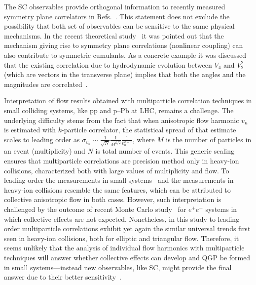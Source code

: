The SC observables provide orthogonal information to recently measured symmetry plane correlators in Refs.~\cite{ALICE:2011ab,Adare:2011tg,Aad:2014fla}. This statement does not exclude the possibility that both set of observables can be sensitive to the same physical mechanisms. In the recent theoretical study~\cite{Giacalone:2016afq} it was pointed out that the mechanism giving rise to symmetry plane correlations (nonlinear coupling) can also contribute to symmetric cumulants. As a concrete example it was discussed that the existing correlation due to hydrodynamic evolution between $V_4$ and $V_2^2$ (which are vectors in the transverse plane) implies that both the angles and the magnitudes are correlated~\cite{Giacalone:2016afq}. 

Interpretation of flow results obtained with multiparticle correlation techniques in small colliding systems, like pp and p--Pb at LHC, remains a challenge. The underlying difficulty stems from the fact that when anisotropic flow harmonic $v_n$ is estimated with $k$-particle correlator, the statistical spread of that estimate scales to leading order as $\sigma_{v_{n}}\sim\frac{1}{\sqrt{N}}\frac{1}{M^{k/2}}\frac{1}{v_{n}^{k-1}}$, where $M$ is the number of particles in an event (multiplicity) and $N$ is total number of events. This generic scaling ensures that multiparticle correlations are precision method only in heavy-ion collisions, characterized both with large values of multiplicity and flow. To leading order the measurements in small systems~\cite{Aad:2013fja,Abelev:2014mda,Khachatryan:2015waa,Adamczyk:2015xjc,Adare:2015ctn} and the measurements in heavy-ion collisions resemble the same features, which can be attributed to collective anisotropic flow in both cases. However, such interpretation is challenged by the outcome of recent Monte Carlo study~\cite{Loizides:2016tew} for $e^+e^-$ systems in which collective effects are not expected. Nonetheless, in this study to leading order multiparticle correlations exhibit yet again the similar universal trends first seen in heavy-ion collisions, both for elliptic and triangular flow. Therefore, it seems unlikely that the analysis of individual flow harmonics with multiparticle techniques will answer whether collective effects can develop and QGP be formed in small systems---instead new observables, like SC, might provide the final answer due to their better sensitivity~\cite{Niemi:2012aj,ALICE:2016kpq}.

